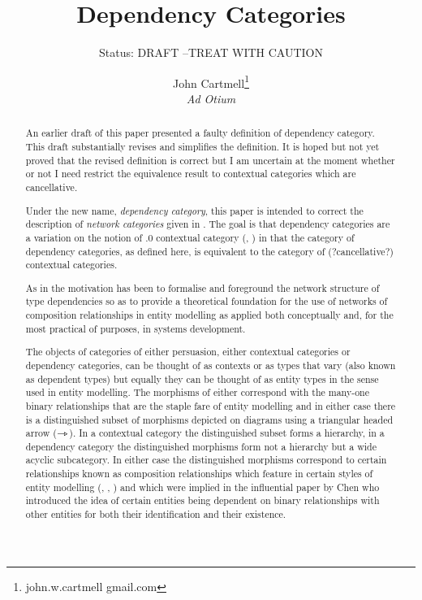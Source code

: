 \documentclass[10pt,a4paper]{scrartcl}
\title{Dependency Categories}
\author{John Cartmell\footnote{john.w.cartmell gmail.com}\\ \normalsize{\textit{Ad Otium}}}
\subtitle{Status: \normalsize{DRAFT --TREAT WITH CAUTION}}
\begin{document}
\maketitle

\begin{abstract}

An earlier draft of this paper presented a faulty definition of dependency category. This draft substantially revises and simplifies the definition. It is hoped but not yet proved that the revised definition is correct
but I am uncertain at the moment whether or not I need restrict the equivalence result to contextual categories which are cancellative. 

\noindent Under the new name, \textit{dependency category}, this paper is intended to correct the description of \textit{network categories} given in  
\cite{Cartmell86B}. The goal is that dependency categories are a variation on the notion of
.0 contextual category (\cite{Cartmell78}, \cite{Cartmell86}) in that  the category of dependency categories, as defined here, is equivalent to the category of (?cancellative?) contextual categories.

As in \cite{Cartmell86B} the motivation has been to formalise
and foreground the network structure of type dependencies so as to provide a theoretical foundation for the use of networks of composition relationships in entity modelling as applied both conceptually and, for the most practical of purposes, in systems development. 

The objects of  categories of either persuasion, either contextual categories or dependency categories, can be thought 
of as contexts or as types that vary (also known as dependent types) but equally they can be thought of as entity 
types in the sense used in entity modelling. The
morphisms of either correspond with the many-one binary relationships that are the staple fare of entity modelling and in either case there is a  distinguished subset of morphisms depicted on diagrams using a triangular headed arrow ($\rightarrowtriangle$). In a contextual category  the distinguished 
subset forms a hierarchy, in a dependency category the distinguished morphisms form not a hierarchy but a wide acyclic subcategory.
In either case the distinguished morphisms correspond to certain relationships known as composition relationships which feature
in certain styles of entity modelling (\cite{ECMA-149}, \cite{Munck1988}, \cite{entitymodelling}) and which were implied in the influential paper by Chen \cite{Chen1976} who introduced the idea of certain entities being dependent on binary relationships 
with other entities for both their identification and their existence.
\end{abstract}
\end{document}
